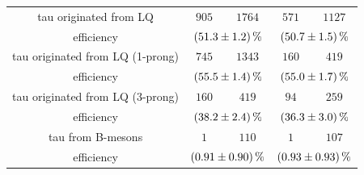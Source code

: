 \begin{table}
\begin{tabular*}{\linewidth}{@{\extracolsep{\fill}}ccccc}
                tau originated from LQ& $905$        & $1764$         & $571$          & $1127$
		\\
		efficiency                  & \multicolumn{2}{c}{$\SI{51.3\pm 1.2}{\percent}$}   & \multicolumn{2}{c}{$\SI{50.7\pm 1.5}{\percent}$}
		\\
		\hline
                tau originated from LQ (1-prong)& $745$        & $1343$         & $160$          & $419$
		\\
		efficiency                  & \multicolumn{2}{c}{$\SI{55.5\pm 1.4}{\percent}$}   & \multicolumn{2}{c}{$\SI{55.0\pm 1.7}{\percent}$}
		\\
		\hline
                tau originated from LQ (3-prong)& $160$        & $419$         & $94$          & $259$
		\\
		efficiency                  & \multicolumn{2}{c}{$\SI{38.2\pm 2.4}{\percent}$}   & \multicolumn{2}{c}{$\SI{36.3\pm 3.0}{\percent}$}
		\\
		\hline
		tau from B-mesons           & $1$            & $110$      & $1$            & $107$ 
		\\
		efficiency                  & \multicolumn{2}{c}{$\SI{0.91\pm 0.90}{\percent}$}   & \multicolumn{2}{c}{$\SI{0.93\pm 0.93}{\percent}$}
		\\

\end{tabular*}
\end{table}
